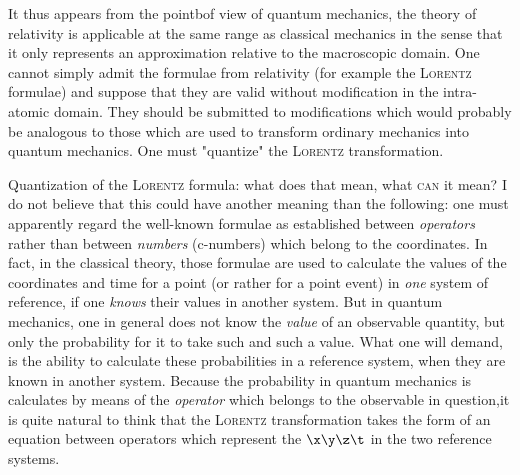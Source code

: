 \documentclass{article}
\renewcommand{\it}[1]{\textit{#1}}
\renewcommand{\sc}[1]{\textsc{#1}}
\begin{document}
It thus appears from the pointbof view of quantum mechanics, the theory of relativity is applicable at the same range as classical mechanics in the sense that it only represents an approximation relative to the macroscopic domain. One cannot simply admit the formulae from relativity (for example the \sc{Lorentz} formulae) and suppose that they are valid without modification in the intra-atomic domain. They should be submitted to modifications which would probably be analogous to those which are used to transform ordinary mechanics into quantum mechanics. One must "quantize" the \sc{Lorentz} transformation.

Quantization of the \sc{Lorentz} formula: what does that mean, what \sc{can} it mean? I do not believe that this could have another meaning than the following: one must apparently regard the well-known formulae as established between \it{operators} rather than between \it{numbers} (c-numbers) which belong to the coordinates. In fact, in the classical theory, those formulae are used to calculate the values of the coordinates and time for a point (or rather for a point event) in \it{one} system of reference, if one \it{knows} their values in another system. But in quantum mechanics, one in general does not know the \it{value} of an observable quantity, but only the probability for it to take such and such a value. What one will demand, is the ability to calculate these probabilities in a reference system, when they are known in another system. Because the probability in quantum mechanics is calculates by means of the \it{operator} which belongs to the observable in question,it is quite natural to think that the \sc{Lorentz} transformation takes the form of an equation between operators which represent the $\x\y\z\t$ in the two reference systems.
\end{document}
